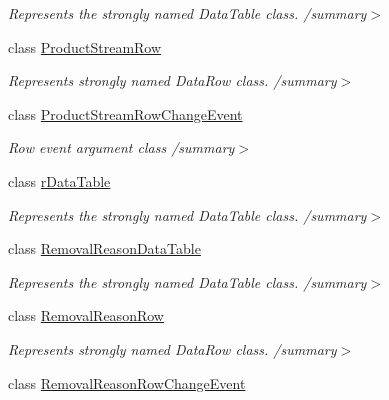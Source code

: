 \begin{DoxyCompactItemize}
\begin{DoxyCompactList}\small\item\em Represents the strongly named Data\+Table class. /summary$>$ \end{DoxyCompactList}\item 
class \hyperlink{class_env_int_1_1_win32_1_1_field_tech_1_1_manager_1_1_data_sets_1_1_guide_ware_mobile_data_set_1_1_product_stream_row}{Product\+Stream\+Row}
\begin{DoxyCompactList}\small\item\em Represents strongly named Data\+Row class. /summary$>$ \end{DoxyCompactList}\item 
class \hyperlink{class_env_int_1_1_win32_1_1_field_tech_1_1_manager_1_1_data_sets_1_1_guide_ware_mobile_data_set_6d119e1ef5d2632a57332691de4d53e9}{Product\+Stream\+Row\+Change\+Event}
\begin{DoxyCompactList}\small\item\em Row event argument class /summary$>$ \end{DoxyCompactList}\item 
class \hyperlink{class_env_int_1_1_win32_1_1_field_tech_1_1_manager_1_1_data_sets_1_1_guide_ware_mobile_data_set_1_1r_data_table}{r\+Data\+Table}
\begin{DoxyCompactList}\small\item\em Represents the strongly named Data\+Table class. /summary$>$ \end{DoxyCompactList}\item 
class \hyperlink{class_env_int_1_1_win32_1_1_field_tech_1_1_manager_1_1_data_sets_1_1_guide_ware_mobile_data_set_1_1_removal_reason_data_table}{Removal\+Reason\+Data\+Table}
\begin{DoxyCompactList}\small\item\em Represents the strongly named Data\+Table class. /summary$>$ \end{DoxyCompactList}\item 
class \hyperlink{class_env_int_1_1_win32_1_1_field_tech_1_1_manager_1_1_data_sets_1_1_guide_ware_mobile_data_set_1_1_removal_reason_row}{Removal\+Reason\+Row}
\begin{DoxyCompactList}\small\item\em Represents strongly named Data\+Row class. /summary$>$ \end{DoxyCompactList}\item 
class \hyperlink{class_env_int_1_1_win32_1_1_field_tech_1_1_manager_1_1_data_sets_1_1_guide_ware_mobile_data_set_deb38dea927d9374a60c90d1719a477f}{Removal\+Reason\+Row\+Change\+Event}

\end{DoxyCompactItemize}
